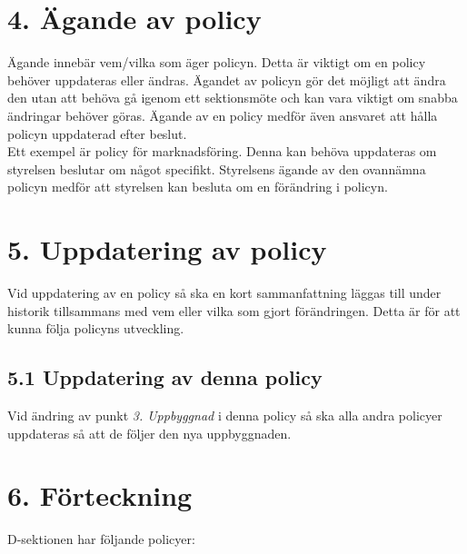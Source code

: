 \documentclass[]{dsekkallelse}
\begin{document}
\prevdepth\tpd

\section{4. Ägande av policy}
Ägande innebär vem/vilka som äger policyn. Detta är viktigt om en policy behöver uppdateras eller ändras. Ägandet av policyn gör det möjligt att ändra den utan att behöva gå igenom ett sektionsmöte och kan vara viktigt om snabba ändringar behöver göras. Ägande av en policy medför även ansvaret att hålla policyn uppdaterad efter beslut.
\\

Ett exempel är policy för marknadsföring. Denna kan behöva uppdateras om styrelsen beslutar om något specifikt. Styrelsens ägande av den ovannämna policyn medför att styrelsen kan besluta om en förändring i policyn.

\section{5. Uppdatering av policy}
Vid uppdatering av en policy så ska en kort sammanfattning läggas till under historik tillsammans med vem eller vilka som gjort förändringen. Detta är för att kunna följa policyns utveckling.

\subsection{5.1 Uppdatering av denna policy}
Vid ändring av punkt \textit{3. Uppbyggnad} i denna policy så ska alla andra policyer uppdateras så att de följer den nya uppbyggnaden.

\section{6. Förteckning}

D-sektionen har följande policyer:
\end{document}
